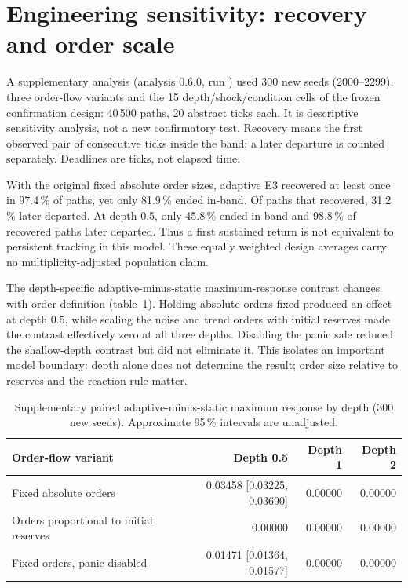 \section{Engineering sensitivity: recovery and order scale}
\label{sec:engineering-sensitivity}

A supplementary analysis (analysis 0.6.0, run \code{\EngineeringRunID}) used 300 new seeds (2000--2299), three order-flow variants and the 15 depth/shock/condition cells of the frozen confirmation design: 40\,500 paths, 20 abstract ticks each. It is descriptive sensitivity analysis, not a new confirmatory test. Recovery means the first observed pair of consecutive ticks inside the band; a later departure is counted separately. Deadlines are ticks, not elapsed time.

With the original fixed absolute order sizes, adaptive E3 recovered at least once in 97.4\,\% of paths, yet only 81.9\,\% ended in-band. Of paths that recovered, 31.2\,\% later departed. At depth 0.5, only 45.8\,\% ended in-band and 98.8\,\% of recovered paths later departed. Thus a first sustained return is not equivalent to persistent tracking in this model. These equally weighted design averages carry no multiplicity-adjusted population claim.

The depth-specific adaptive-minus-static maximum-response contrast changes with order definition (table~\ref{tab:engineering-sensitivity}). Holding absolute orders fixed produced an effect at depth 0.5, while scaling the noise and trend orders with initial reserves made the contrast effectively zero at all three depths. Disabling the panic sale reduced the shallow-depth contrast but did not eliminate it. This isolates an important model boundary: depth alone does not determine the result; order size relative to reserves and the reaction rule matter.

\begin{table}[htbp]
\centering
\caption{Supplementary paired adaptive-minus-static maximum response by depth (300 new seeds). Approximate 95\,\% intervals are unadjusted.}
\label{tab:engineering-sensitivity}
\small
\begin{tabular}{@{}lrrr@{}}
\toprule
Order-flow variant & Depth 0.5 & Depth 1 & Depth 2 \\
\midrule
Fixed absolute orders & 0.03458 [0.03225, 0.03690] & 0.00000 & 0.00000 \\
Orders proportional to initial reserves & 0.00000 & 0.00000 & 0.00000 \\
Fixed orders, panic disabled & 0.01471 [0.01364, 0.01577] & 0.00000 & 0.00000 \\
\bottomrule
\end{tabular}
\end{table}

